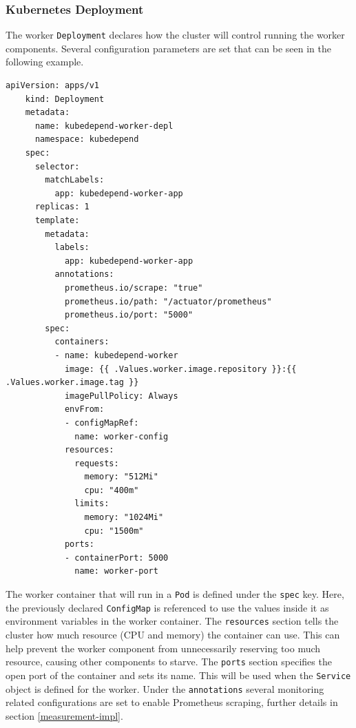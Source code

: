\subsubsection{Kubernetes Deployment}

The worker \texttt{Deployment} declares how the cluster will control running the worker components. Several configuration parameters are set that can be seen in the following example.

\vspace{0.5cm}
\begin{minipage}{\linewidth}
	\begin{lstlisting}[caption={Worker \texttt{Deployment}}]
	apiVersion: apps/v1
	kind: Deployment
	metadata:
	  name: kubedepend-worker-depl
	  namespace: kubedepend
	spec:
	  selector:
	    matchLabels:
	      app: kubedepend-worker-app
	  replicas: 1
	  template:
	    metadata:
	      labels:
	        app: kubedepend-worker-app
	      annotations:
	        prometheus.io/scrape: "true"
	        prometheus.io/path: "/actuator/prometheus"
	        prometheus.io/port: "5000"
	    spec:
	      containers:
	      - name: kubedepend-worker
	        image: {{ .Values.worker.image.repository }}:{{ .Values.worker.image.tag }}
	        imagePullPolicy: Always
	        envFrom:
	        - configMapRef:
	          name: worker-config
	        resources:
	          requests:
	            memory: "512Mi"
	            cpu: "400m"
	          limits:
	            memory: "1024Mi"
	            cpu: "1500m"
	        ports:
	        - containerPort: 5000
	          name: worker-port
	\end{lstlisting}
\end{minipage}

The worker container that will run in a \texttt{Pod} is defined under the \texttt{spec} key. Here, the previously declared \texttt{ConfigMap} is referenced to use the values inside it as environment variables in the worker container. The \texttt{resources} section tells the cluster how much resource (CPU and memory) the container can use. This can help prevent the worker component from unnecessarily reserving too much resource, causing other components to starve. The \texttt{ports} section specifies the open port of the container and sets its name. This will be used when the \texttt{Service} object is defined for the worker. Under the \texttt{annotations} several monitoring related configurations are set to enable Prometheus scraping, further details in section \ref{measurement-impl}.

